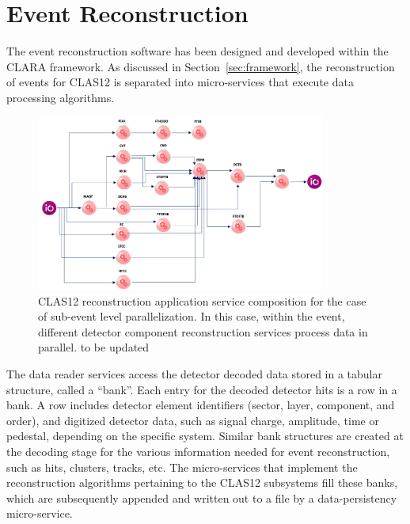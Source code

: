 \section{Event Reconstruction}
\label{sec:recon}

The event reconstruction software has been designed and developed within the CLARA framework. As discussed
in Section~\ref{sec:framework}, the reconstruction of events for CLAS12 is separated into micro-services that
execute data processing algorithms.

\begin{figure}
\centering
\includegraphics[width=0.85\textwidth]{pics/ServiceComposition.png}
\caption{CLAS12 reconstruction application service composition for the case of sub-event level parallelization.
In this case, within the event, different detector component reconstruction services process data in parallel.{\color{red} to be updated}}
\label{fig:services}
\end{figure}

The data reader services access the detector decoded data stored in a tabular structure, called a ``bank''.
Each entry for the decoded detector hits is a row in a bank. A row includes detector element identifiers (sector,
layer, component, and order), and digitized detector data, such as signal charge, amplitude, time or pedestal,
depending on the specific system. Similar bank structures are created at the decoding stage for the various
information needed for event reconstruction, such as hits, clusters, tracks, etc. The micro-services that
implement the reconstruction algorithms pertaining to the CLAS12 subsystems fill these banks, which are
subsequently appended and written out to a file by a data-persistency micro-service.

